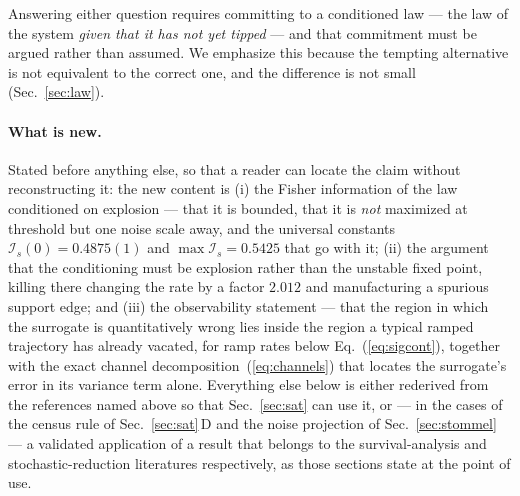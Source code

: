 \documentclass[%
 twocolumn,
 superscriptaddress,
 amsmath,amssymb,
 aps,
 pre,
 floatfix,
]{revtex4-2}
\newcommand{\Ifish}{\mathcal{I}}
\begin{document}
Answering either question requires committing to a conditioned law --- the law of the system \emph{given that it has not yet tipped} --- and that commitment must be argued rather than assumed.  We emphasize this because the tempting alternative is not equivalent to the correct one, and the difference is not small (Sec.~\ref{sec:law}).

\paragraph{What is new.}
Stated before anything else, so that a reader can locate the claim without reconstructing it: the new content is (i) the Fisher information of the law conditioned on explosion --- that it is bounded, that it is \emph{not} maximized at threshold but one noise scale away, and the universal constants $\Ifish_s(0)=0.4875(1)$ and $\max\Ifish_s=0.5425$ that go with it; (ii) the argument that the conditioning must be explosion rather than the unstable fixed point, killing there changing the rate by a factor $2.012$ and manufacturing a spurious support edge; and (iii) the observability statement --- that the region in which the surrogate is quantitatively wrong lies inside the region a typical ramped trajectory has already vacated, for ramp rates below Eq.~(\ref{eq:sigcont}), together with the exact channel decomposition~(\ref{eq:channels}) that locates the surrogate's error in its variance term alone.  Everything else below is either rederived from the references named above so that Sec.~\ref{sec:sat} can use it, or --- in the cases of the census rule of Sec.~\ref{sec:sat}\,D and the noise projection of Sec.~\ref{sec:stommel} --- a validated application of a result that belongs to the survival-analysis and stochastic-reduction literatures respectively, as those sections state at the point of use.
\end{document}
